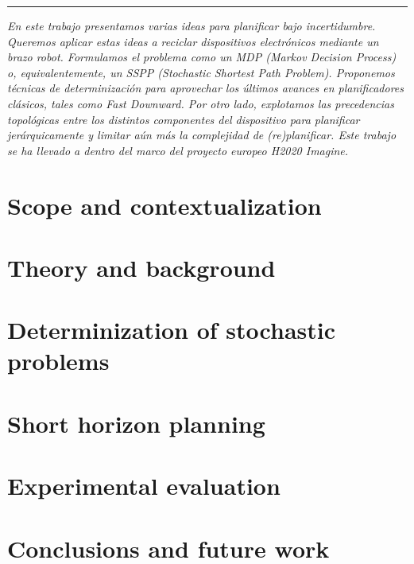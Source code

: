 \documentclass[11pt,a4paper,oldfontcommands,oneside]{memoir}
\begin{document}
\vspace{\abstractseparation}
\hrule
\vspace{\abstractseparation}
\noindent
{\itshape
	En este trabajo presentamos varias ideas para planificar bajo
	incertidumbre. Queremos aplicar estas ideas a reciclar
	dispositivos electr\'onicos mediante un brazo robot. Formulamos
	el problema como un MDP (Markov Decision Process) o, equivalentemente,
	un SSPP (Stochastic Shortest Path Problem). Proponemos t\'ecnicas
	de determinizaci\'on para aprovechar los últimos avances en
	planificadores cl\'asicos, tales como Fast Downward. Por otro lado,
	explotamos las precedencias topol\'ogicas entre los distintos
	componentes del dispositivo para planificar jer\'arquicamente y
	limitar a\'un m\'as la complejidad de (re)planificar. Este trabajo
	se ha llevado a dentro del marco del proyecto europeo H2020 Imagine.
}

\cleardoublepage



\tableofcontents

\cleardoublepage


%

\chapter{Scope and contextualization}


\chapter{Theory and background}


\chapter{Determinization of stochastic problems}


\chapter{Short horizon planning}


\chapter{Experimental evaluation}


\chapter{Conclusions and future work}


\printbibliography
\end{document}
